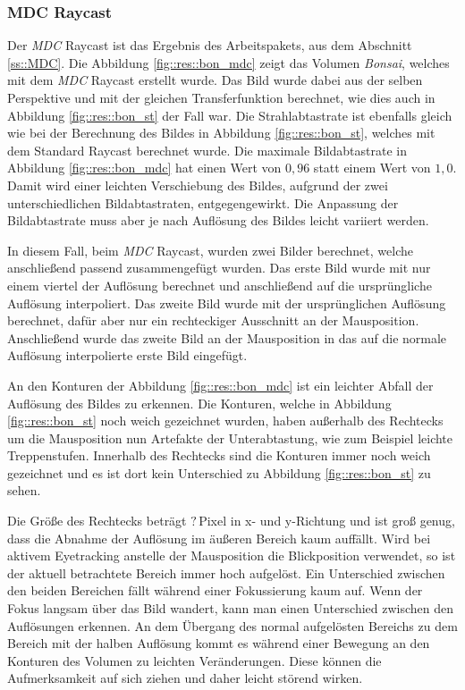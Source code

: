 \subsubsection{MDC Raycast}\label{ss::res::mdc}
Der \emph{MDC} Raycast ist das Ergebnis des Arbeitspakets, aus dem Abschnitt \ref{ss::MDC}.
Die Abbildung \ref{fig::res::bon_mdc} zeigt das Volumen \emph{Bonsai}, welches mit dem \emph{MDC} Raycast erstellt wurde.
Das Bild wurde dabei aus der selben Perspektive und mit der gleichen Transferfunktion berechnet, wie dies auch in Abbildung \ref{fig::res::bon_st} der Fall war.
Die Strahlabtastrate ist ebenfalls gleich wie bei der Berechnung des Bildes in Abbildung \ref{fig::res::bon_st}, welches mit dem Standard Raycast berechnet wurde.
Die maximale Bildabtastrate in Abbildung \ref{fig::res::bon_mdc} hat einen Wert von $0,96$ statt einem Wert von $1,0$.
Damit wird einer leichten Verschiebung des Bildes, aufgrund der zwei unterschiedlichen Bildabtastraten, entgegengewirkt.
Die Anpassung der Bildabtastrate muss aber je nach Auflösung des Bildes leicht variiert werden.

In diesem Fall, beim \emph{MDC} Raycast, wurden zwei Bilder berechnet, welche anschließend passend zusammengefügt wurden.
Das erste Bild wurde mit nur einem viertel der Auflösung berechnet und anschließend auf die ursprüngliche Auflösung interpoliert.
Das zweite Bild wurde mit der ursprünglichen Auflösung berechnet, dafür aber nur ein rechteckiger Ausschnitt an der Mausposition.
Anschließend wurde das zweite Bild an der Mausposition in das auf die normale Auflösung interpolierte erste Bild eingefügt.

An den Konturen der Abbildung \ref{fig::res::bon_mdc} ist ein leichter Abfall der Auflösung des Bildes zu erkennen.
Die Konturen, welche in Abbildung \ref{fig::res::bon_st} noch weich gezeichnet wurden, haben außerhalb des Rechtecks um die Mausposition nun Artefakte der Unterabtastung, wie zum Beispiel leichte Treppenstufen.
Innerhalb des Rechtecks sind die Konturen immer noch weich gezeichnet und es ist dort kein Unterschied zu Abbildung \ref{fig::res::bon_st} zu sehen.

Die Größe des Rechtecks beträgt $?$\,Pixel in x- und y-Richtung und ist groß genug, dass die Abnahme der Auflösung im äußeren Bereich kaum auffällt.
Wird bei aktivem Eyetracking anstelle der Mausposition die Blickposition verwendet, so ist der aktuell betrachtete Bereich immer hoch aufgelöst.
Ein Unterschied zwischen den beiden Bereichen fällt während einer Fokussierung kaum auf.
Wenn der Fokus langsam über das Bild wandert, kann man einen Unterschied zwischen den Auflösungen erkennen.
An dem Übergang des normal aufgelösten Bereichs zu dem Bereich mit der halben Auflösung kommt es während einer Bewegung an den Konturen des Volumen zu leichten Veränderungen.
Diese können die Aufmerksamkeit auf sich ziehen und daher leicht störend wirken.


